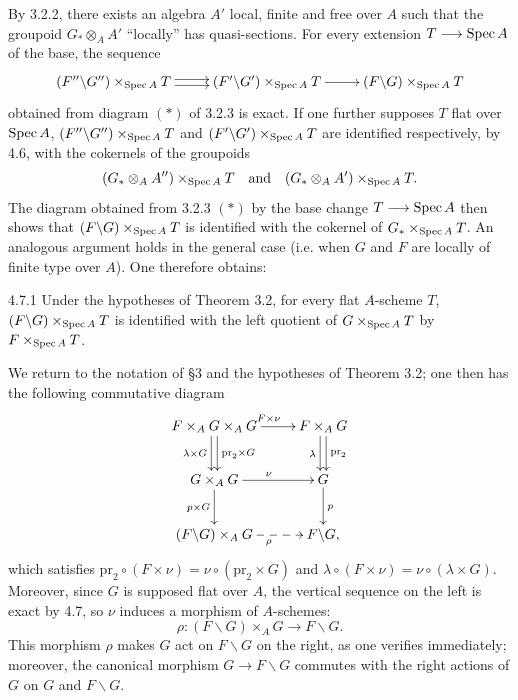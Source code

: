 By 3.2.2, there exists an algebra $A'$ local, finite and free over $A$ such that the groupoid $G_*\otimes_AA'$ ``locally'' has quasi-sections. For every extension $T\longrightarrow\operatorname{Spec} A$ of the base, the sequence
\[
\xymatrix{(F''\backslash G'')\times_{\Spec A}T\ar@<.5ex>[r]\ar@<-.5ex>[r]&(F'\backslash G')\times_{\Spec A}T\ar[r]&(F\backslash G)\times_{\Spec A}T}
\]
obtained from diagram $(*)$ of 3.2.3 is exact. If one further supposes $T$ flat over $\operatorname{Spec} A$, $(F''\backslash G'')\times_{\operatorname{Spec} A}T$ and $(F'\backslash G')\times_{\operatorname{Spec} A}T$ are identified respectively, by 4.6, with the cokernels of the groupoids
\[
(G_*\otimes_AA'')\times_{\operatorname{Spec} A}T\quad\text{and}\quad(G_*\otimes_AA')\times_{\operatorname{Spec} A}T.
\]
The diagram obtained from 3.2.3 $(*)$ by the base change $T\longrightarrow\operatorname{Spec} A$ then shows that $(F\backslash G)\times_{\operatorname{Spec} A}T$ is identified with the cokernel of $G_*\times_{\operatorname{Spec} A}T$. An analogous argument holds in the general case (i.e. when $G$ and $F$ are locally of finite type over $A$). One therefore obtains:
\begin{proposition}{4.7.1}\label{VIA.4.7.1}
Under the hypotheses of Theorem 3.2, for every flat $A$-scheme $T$, $(F\backslash G)\times_{\operatorname{Spec} A}T$ is identified with the left quotient of $G\times_{\operatorname{Spec} A}T$ by $F\times_{\operatorname{Spec} A}T$.
\end{proposition}

We return to the notation of §3 and the hypotheses of Theorem 3.2; one then has the following commutative diagram
\[
\xymatrix{F\times_AG\times_AG\ar[r]^{F\times\nu}\ar@<.5ex>[d]^{\mathrm{pr}_2\times G}\ar@<-.5ex>[d]_{\lambda\times G}&F\times_AG\ar@<.5ex>[d]^{\mathrm{pr}_2}\ar@<-.5ex>[d]_\lambda\\G\times_AG\ar[r]^\nu\ar[d]_{p\times G}&G\ar[d]^p\\(F\backslash G)\times_AG\ar@{-->}[r]_\rho&F\backslash G,}
\]
which satisfies $\mathrm{pr}_2\circ(F\times\nu)=\nu\circ(\mathrm{pr}_2\times G)$ and $\lambda\circ(F\times\nu)=\nu\circ(\lambda\times G)$. Moreover, since $G$ is supposed flat over $A$, the vertical sequence on the left is exact by 4.7, so $\nu$ induces a morphism of $A$-schemes:
\[
\rho:(F\backslash G)\times_AG\to F\backslash G.
\]
This morphism $\rho$ makes $G$ act on $F\backslash G$ on the right, as one verifies immediately; moreover, the canonical morphism $G\to F\backslash G$ commutes with the right actions of $G$ on $G$ and $F\backslash G$.

